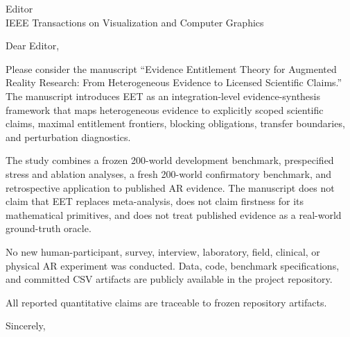 \documentclass[11pt]{letter}
\begin{document}
\begin{letter}{Editor\\IEEE Transactions on Visualization and Computer Graphics}
\opening{Dear Editor,}
Please consider the manuscript ``Evidence Entitlement Theory for Augmented Reality Research: From Heterogeneous Evidence to Licensed Scientific Claims.'' The manuscript introduces EET as an integration-level evidence-synthesis framework that maps heterogeneous evidence to explicitly scoped scientific claims, maximal entitlement frontiers, blocking obligations, transfer boundaries, and perturbation diagnostics.

The study combines a frozen 200-world development benchmark, prespecified stress and ablation analyses, a fresh 200-world confirmatory benchmark, and retrospective application to published AR evidence. The manuscript does not claim that EET replaces meta-analysis, does not claim firstness for its mathematical primitives, and does not treat published evidence as a real-world ground-truth oracle.

No new human-participant, survey, interview, laboratory, field, clinical, or physical AR experiment was conducted. Data, code, benchmark specifications, and committed CSV artifacts are publicly available in the project repository.

All reported quantitative claims are traceable to frozen repository artifacts.
\closing{Sincerely,}
\end{letter}
\end{document}
